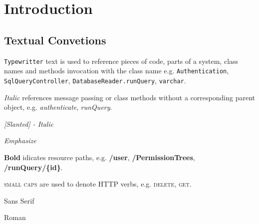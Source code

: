 \chapter{Introduction}

\section{Textual Convetions}

\texttt{Typewritter} text is used to reference pieces of code, parts of a system, class names and methods invocation with the class name e.g. \texttt{Authentication}, \texttt{SqlQueryController}, \texttt{DatabaseReader.runQuery}, \texttt{varchar}.

\textit{Italic}  references message passing or class methods without a corresponding parent object, e.g. \textit{authenticate}, \textit{runQuery}.

\textsl{[Slanted] - Italic}

\emph{Emphasize}

\textbf{Bold} idicates resource paths, e.g. \textbf{/user}, \textbf{/PermissionTrees}, \textbf{/runQuery/\{id\}}.

\textsc{small caps} are used to denote HTTP verbs, e.g. \textsc{delete}, \textsc{get}.

\textsf{Sans Serif}

\textrm{Roman}
